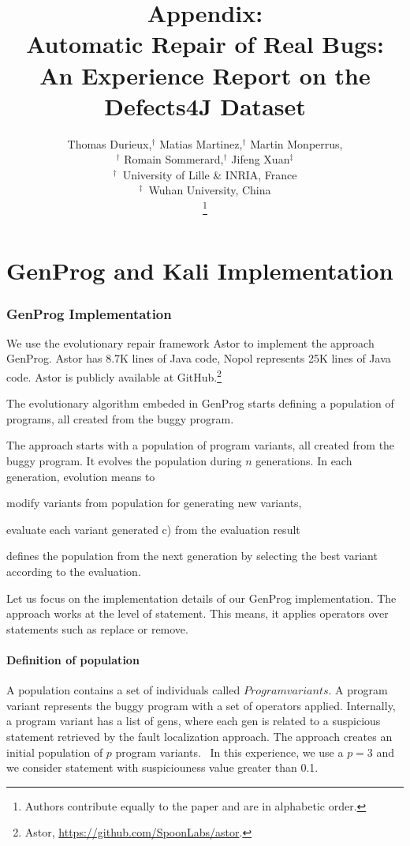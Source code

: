 \documentclass[11pt]{article} %
\title{
Appendix:\\
Automatic Repair of Real Bugs: \\ An Experience Report on the Defects4J Dataset
}
\author{
Thomas Durieux,$^\dag$ Matias Martinez,$^\dag$ Martin Monperrus,\\$^\dag$ Romain Sommerard,$^\dag$ Jifeng Xuan$^\ddag$ \\
$^\dag$\ University of Lille \& INRIA, France \\
$^\ddag$\ Wuhan University, China \\
\thanks{Authors contribute equally to the paper and are in alphabetic order.} \\ 
}
\date{}
\begin{document}
\maketitle

\section{GenProg and Kali Implementation}




\subsubsection{GenProg Implementation}

We use the evolutionary repair framework Astor \cite{AstorTechReport} to implement the approach GenProg. Astor has 8.7K lines of Java code, Nopol represents 25K lines of Java code. Astor is publicly available at GitHub.\footnote{Astor, \url{https://github.com/SpoonLabs/astor}.}

The evolutionary algorithm embeded in GenProg starts defining a population of programs, all created from the buggy program. 


The approach starts with a population of program variants, all created from the buggy program. 
It evolves the population during $n$ generations. 
In each generation, evolution means to 
\begin{inparaenum}
\item modify variants from population for generating new variants, 
\item evaluate each variant generated c) from the evaluation result 
\item defines the population from the next generation by selecting the best variant according to the evaluation.
\end{inparaenum}

Let us focus on the implementation details of our GenProg implementation.
The approach works at the level of statement. 
This means, it applies operators over statements such as replace or remove.

\paragraph{Definition of population}
A population contains a set of individuals called $Program variants$.
A program variant represents the buggy program with a set of operators applied. 
Internally, a program variant has a list of gens, where each gen is related to a suspicious statement retrieved by the fault localization approach.
The approach creates an initial population of $p$ program variants. \
In this experience, we use a $p=3$ and we consider statement with suspiciouness value greater than 0.1.
\end{document}
